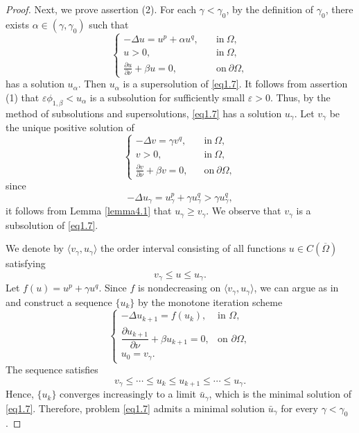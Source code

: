 \documentclass[12pt,reqno]{amsart}
\numberwithin{equation}{section}
\theoremstyle{definition}
\begin{document}
\begin{proof}
Next, we prove assertion (2). For each $\gamma<\gamma_0$, by the definition of $\gamma_0$, there exists $\alpha\in(\gamma,\gamma_0)$ such that 
\begin{equation*}
\begin{cases}
-\Delta u=u^p+\alpha u^q,\quad &\text{in}\ \Omega,\\
u>0,  \quad &\text{in}\ \Omega,\\
\frac{\partial u}{\partial \nu}+\beta u=0, &\text{on}\ \partial\Omega,
\end{cases}
\end{equation*}
has a solution $u_\alpha$. Then $u_\alpha$ is a supersolution of \eqref{eq1.7}. It follows from assertion (1) that $\varepsilon\phi_{1,\beta}<u_\alpha$ is a subsolution for sufficiently small $\varepsilon>0$. Thus, by the method of subsolutions and supersolutions, \eqref{eq1.7} has a solution $u_\gamma$. Let $v_\gamma$ be the unique positive solution of 
\begin{equation}\label{cgl4.8}
\begin{cases}
-\Delta v=\gamma v^q,\quad &\text{in}\ \Omega,\\
v>0, &\text{in}\ \Omega,\\
\frac{\partial v}{\partial \nu}+\beta v=0, &\text{on}\ \partial \Omega,
\end{cases}
\end{equation}  
since 
$$
-\Delta u_\gamma=u_\gamma^p+\gamma u_\gamma^q>\gamma u_\gamma^q,
$$
it follows from Lemma \ref{lemma4.1} that $u_\gamma\ge v_\gamma$. We observe that $v_\gamma$ is a subsolution of \eqref{eq1.7}. 

We denote by $\langle v_\gamma, u_\gamma \rangle$ the order interval consisting of all functions
$u\in C(\overline{\Omega})$ satisfying
\[
v_\gamma\le u\le u_\gamma.
\]
Let $f(u)=u^p+\gamma u^q$. Since $f$ is nondecreasing on
$\langle v_\gamma, u_\gamma \rangle$, we can argue as in \cite{P} and construct a sequence
$\{u_k\}$ by the monotone iteration scheme
\begin{equation*}
\begin{cases}
-\Delta u_{k+1}=f(u_k), & \text{in }\Omega,\\
\dfrac{\partial u_{k+1}}{\partial \nu}+\beta u_{k+1}=0,
& \text{on }\partial\Omega,\\
u_0=v_\gamma.
\end{cases}
\end{equation*}
The sequence satisfies
\[
v_\gamma\le \cdots \le u_k\le u_{k+1}\le \cdots \le u_\gamma.
\]
Hence, $\{u_k\}$ converges increasingly to a limit $\bar u_\gamma$, which is the minimal solution of \eqref{eq1.7}. Therefore, problem \eqref{eq1.7} admits a minimal solution $\bar u_\gamma$ for every $\gamma<\gamma_0$.




\end{proof}
\end{document}
